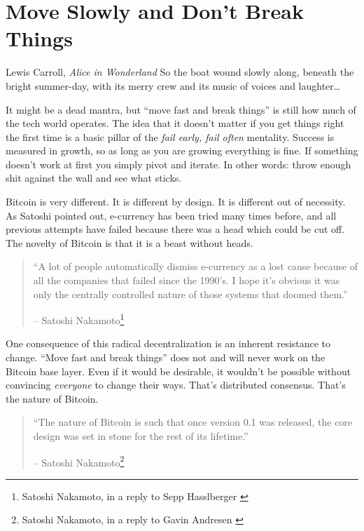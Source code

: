\chapter{Move Slowly and Don't Break Things}
\label{les:18}

\begin{chapquote}{Lewis Carroll, \textit{Alice in Wonderland}}
So the boat wound slowly along, beneath the bright summer-day, with its merry crew and its music of voices and laughter\ldots
\end{chapquote}

It might be a dead mantra, but \enquote{move fast and break things} is still how
much of the tech world operates. The idea that it doesn't matter if you
get things right the first time is a basic pillar of the \textit{fail early,
fail often} mentality. Success is measured in growth, so as long as you
are growing everything is fine. If something doesn't work at first you
simply pivot and iterate. In other words: throw enough shit against the
wall and see what sticks.

Bitcoin is very different. It is different by design. It is different
out of necessity. As Satoshi pointed out, e-currency has been tried
many times before, and all previous attempts have failed because there
was a head which could be cut off. The novelty of Bitcoin is that it is
a beast without heads.

\begin{quotation}\begin{samepage}
\enquote{A lot of people automatically dismiss e-currency as a lost cause
because of all the companies that failed since the 1990's. I hope it's
obvious it was only the centrally controlled nature of those systems
that doomed them.}
\begin{flushright} -- Satoshi Nakamoto\footnote{Satoshi Nakamoto, in a reply to Sepp Hasslberger \cite{satoshi-centralized-nature}}
\end{flushright}\end{samepage}\end{quotation}

One consequence of this radical decentralization is an inherent
resistance to change. \enquote{Move fast and break things} does not and will
never work on the Bitcoin base layer. Even if it would be desirable, it
wouldn't be possible without convincing \textit{everyone} to change their ways.
That's distributed consensus. That's the nature of Bitcoin.

\begin{quotation}\begin{samepage}
\enquote{The nature of Bitcoin is such that once version 0.1 was released, the
core design was set in stone for the rest of its lifetime.}
\begin{flushright} -- Satoshi Nakamoto\footnote{Satoshi Nakamoto, in a reply to Gavin Andresen \cite{satoshi-centralized-nature}}
\end{flushright}\end{samepage}\end{quotation}

